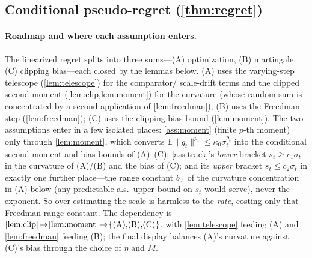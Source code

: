 \documentclass{article}
\newcommand{\E}{\mathbb{E}}
\newcommand{\norm}[1]{\lVert #1 \rVert}
\newcommand{\gt}{g_t}
\begin{document}
\subsection{Conditional pseudo-regret (\texorpdfstring{\cref{thm:regret}}{Theorem 2})}

\paragraph{Roadmap and where each assumption enters.} The linearized regret splits into
three sums---(A) optimization, (B) martingale, (C) clipping bias---each closed by the
lemmas below. (A) uses the varying-step telescope (\cref{lem:telescope}) for the comparator/
scale-drift terms and the clipped second moment (\cref{lem:clip,lem:moment}) for the
curvature (whose random sum is concentrated by a second application of \cref{lem:freedman});
(B) uses the Freedman step (\cref{lem:freedman}); (C) uses the clipping-bias
bound (\cref{lem:moment}). The two assumptions enter in a few isolated places:
\cref{ass:moment} (finite $p$-th moment) only through \cref{lem:moment}, which converts
$\E\norm{\gt}^{p_t}\le\kappa_0\sigma_t^{p_t}$ into the conditional second-moment and bias bounds
of (A)--(C); \cref{ass:track}'s \emph{lower} bracket $s_t\ge c_1\sigma_t$ in the
curvature of (A)/(B) and the bias of (C); and its \emph{upper} bracket $s_t\le c_2\sigma_t$
in exactly one further place---the range constant $b_A$ of the curvature concentration in (A)
below (any predictable a.s.\ upper bound on $s_t$ would serve), never the exponent. So
over-estimating the scale is harmless to the \emph{rate}, costing only that Freedman range
constant. The dependency is
$\cref{lem:clip}\!\to\!\cref{lem:moment}\!\to\!\{\text{(A),(B),(C)}\}$, with
\cref{lem:telescope} feeding (A) and \cref{lem:freedman} feeding (B); the final display
balances (A)'s curvature against (C)'s bias through the choice of $\eta$ and $M$.
\end{document}
